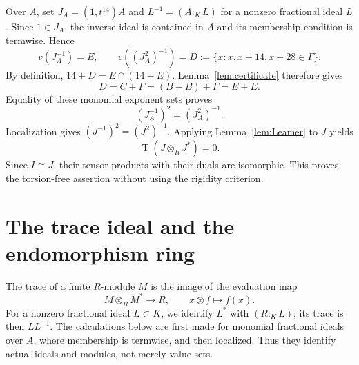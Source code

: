 \documentclass[11pt,letterpaper]{article}
\theoremstyle{remark}
\newcommand{\Tors}{\operatorname{T}}
\numberwithin{equation}{section}
\begin{document}
Over $A$, set $J_A=(1,t^{14})A$ and $L^{-1}=(A:_K L)$ for a nonzero fractional ideal $L$. Since $1\in J_A$, the inverse ideal is contained in $A$ and its membership condition is termwise. Hence
\[
 v(J_A^{-1})=E,\qquad
 v((J_A^2)^{-1})=D:=\{x:x,x+14,x+28\in\Gamma\}.
\]
By definition, $14+D=E\cap(14+E)$. Lemma~\ref{lem:certificate} therefore gives
\[
 D=C+\Gamma=(B+B)+\Gamma=E+E.
\]
Equality of these monomial exponent sets proves
\begin{equation}\label{eq:inverseidentity}
 (J_A^{-1})^2=(J_A^2)^{-1}.
\end{equation}
Localization gives $(J^{-1})^2=(J^2)^{-1}$. Applying Lemma~\ref{lem:Leamer} to $J$ yields
\[
 \Tors(J\otimes_R J^*)=0.
\]
Since $I\cong J$, their tensor products with their duals are isomorphic. This proves the torsion-free assertion without using the rigidity criterion.

\section{The trace ideal and the endomorphism ring}\label{sec:structure}
The trace of a finite $R$-module $M$ is the image of the evaluation map
\[
 M\otimes_R M^*\longrightarrow R,\qquad x\otimes f\longmapsto f(x).
\]
For a nonzero fractional ideal $L\subset K$, we identify $L^*$ with $(R:_K L)$; its trace is then $LL^{-1}$. The calculations below are first made for monomial fractional ideals over $A$, where membership is termwise, and then localized. Thus they identify actual ideals and modules, not merely value sets.
\end{document}
